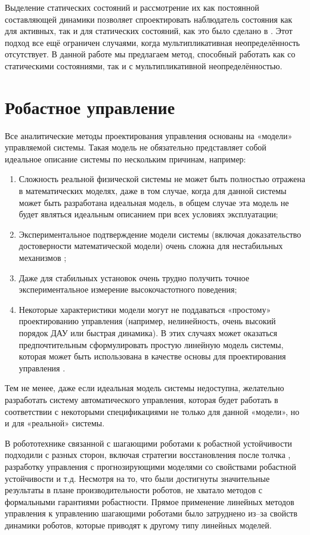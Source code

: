Выделение статических состояний и рассмотрение их как постоянной составляющей динамики позволяет спроектировать наблюдатель состояния как для активных, так и для статических состояний, как это было сделано в \cite{SAVIN2021}. Этот подход все ещё ограничен случаями, когда мультипликативная неопределённость отсутствует. В данной работе мы предлагаем метод, способный работать как со статическими состояниями, так и с мультипликативной неопределённостью.

\section{Робастное управление}\label{sec:ch1/sec4}
Все аналитические методы проектирования управления основаны на «модели» управляемой системы. Такая модель не обязательно представляет собой идеальное описание системы по нескольким причинам, например:
\begin{enumerate}[beginpenalty=10000]
	\item Сложность реальной физической системы не может быть полностью отражена в математических моделях, даже в том случае, когда для данной системы может быть разработана идеальная модель, в общем случае эта модель не будет являться идеальным описанием при всех условиях эксплуатации;
	\item Экспериментальное подтверждение модели системы (включая доказательство достоверности математической модели) очень сложна для нестабильных механизмов \cite{Oral2022};
	\item Даже для стабильных установок очень трудно получить точное экспериментальное измерение высокочастотного поведения;
	\item Некоторые характеристики модели могут не поддаваться «простому» проектированию управления (например, нелинейность, очень высокий порядок ДАУ или быстрая динамика). В этих случаях может оказаться предпочтительным сформулировать простую линейную модель системы, которая может быть использована в качестве основы для проектирования управления \cite{barmish1994new, Garulli2000}.
\end{enumerate}

Тем не менее, даже если идеальная модель системы недоступна, желательно разработать систему автоматического управления, которая будет работать в соответствии с некоторыми спецификациями не только для данной «модели», но и для «реальной» системы.

В робототехнике связанной с шагающими роботами к робастной устойчивости подходили с разных сторон, включая стратегии восстановления после толчка \cite{Pratt2006}, разработку управления с прогнозирующими моделями со свойствами робастной устойчивости \cite{KIM2019} и т.д. Несмотря на то, что были достигнуты значительные результаты в плане производительности роботов, не хватало методов с формальными гарантиями робастности. Прямое применение линейных методов управления к управлению шагающими роботами было затруднено из--за свойств динамики роботов, которые приводят к другому типу линейных моделей.

